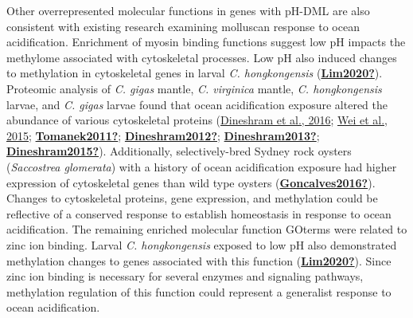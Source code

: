 \documentclass [11pt, proquest] {uwthesis}[2015/03/03]
\begin{document}
Other overrepresented molecular functions in genes with pH-DML are also consistent with existing research examining molluscan response to ocean acidification. Enrichment of myosin binding functions suggest low pH impacts the methylome associated with cytoskeletal processes. Low pH also induced changes to methylation in cytoskeletal genes in larval \emph{C. hongkongensis} (\protect\hyperlink{ref-Lim2020}{\textbf{Lim2020?}}). Proteomic analysis of \emph{C. gigas} mantle, \emph{C. virginica} mantle, \emph{C. hongkongensis} larvae, and \emph{C. gigas} larvae found that ocean acidification exposure altered the abundance of various cytoskeletal proteins (\protect\hyperlink{ref-Dineshram2016}{Dineshram et al., 2016}; \protect\hyperlink{ref-Wei2015}{Wei et al., 2015}; \protect\hyperlink{ref-Tomanek2011}{\textbf{Tomanek2011?}}; \protect\hyperlink{ref-Dineshram2012}{\textbf{Dineshram2012?}}; \protect\hyperlink{ref-Dineshram2013}{\textbf{Dineshram2013?}}; \protect\hyperlink{ref-Dineshram2015}{\textbf{Dineshram2015?}}). Additionally, selectively-bred Sydney rock oysters (\emph{Saccostrea glomerata}) with a history of ocean acidification exposure had higher expression of cytoskeletal genes than wild type oysters (\protect\hyperlink{ref-Goncalves2016}{\textbf{Goncalves2016?}}). Changes to cytoskeletal proteins, gene expression, and methylation could be reflective of a conserved response to establish homeostasis in response to ocean acidification. The remaining enriched molecular function GOterms were related to zinc ion binding. Larval \emph{C. hongkongensis} exposed to low pH also demonstrated methylation changes to genes associated with this function (\protect\hyperlink{ref-Lim2020}{\textbf{Lim2020?}}). Since zinc ion binding is necessary for several enzymes and signaling pathways, methylation regulation of this function could represent a generalist response to ocean acidification.
\end{document}

